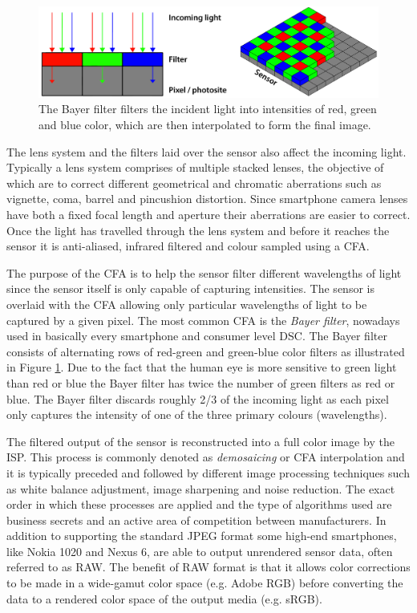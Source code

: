 \documentclass[thesis.tex]{subfiles}
\begin{document}
\begin{figure}[ht]
\centering \includegraphics[width=\textwidth]{images/bayer}
\caption{The Bayer filter filters the incident light into intensities of red, green and blue color, which are then interpolated to form the final image. \label{figure:bayer}}
\end{figure}

The lens system and the filters laid over the sensor also affect the incoming light. Typically a lens system comprises of multiple stacked lenses, the objective of which are to correct different geometrical and chromatic aberrations such as vignette, coma, barrel and pincushion distortion. Since smartphone camera lenses have both a fixed focal length and aperture their aberrations are easier to correct. Once the light has travelled through the lens system and before it reaches the sensor it is anti-aliased, infrared filtered and colour sampled using a CFA. \cite{color_pipeline}

The purpose of the CFA is to help the sensor filter different wavelengths of light since the sensor itself is only capable of capturing intensities. The sensor is overlaid with the CFA allowing only particular wavelengths of light to be captured by a given pixel. The most common CFA is the \textit{Bayer filter}, nowadays used in basically every smartphone and consumer level DSC. The Bayer filter consists of alternating rows of red-green and green-blue color filters as illustrated in Figure \ref{figure:bayer}. Due to the fact that the human eye is more sensitive to green light than red or blue the Bayer filter has twice the number of green filters as red or blue. The Bayer filter discards roughly 2/3 of the incoming light as each pixel only captures the intensity of one of the three primary colours (wavelengths).

The filtered output of the sensor is reconstructed into a full color image by the ISP. This process is commonly denoted as \textit{demosaicing} or CFA interpolation and it is typically preceded and followed by different image processing techniques such as white balance adjustment, image sharpening and noise reduction. The exact order in which these processes are applied and the type of algorithms used are business secrets and an active area of competition between manufacturers. In addition to supporting the standard JPEG format some high-end smartphones, like Nokia 1020 and Nexus 6, are able to output unrendered sensor data, often referred to as RAW. The benefit of RAW format is that it allows color corrections to be made in a wide-gamut color space (e.g. Adobe RGB) before converting the data to a rendered color space of the output media (e.g. sRGB).
\end{document}
